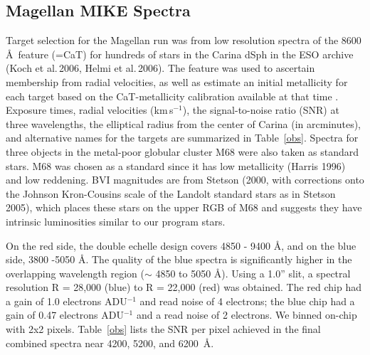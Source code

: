\documentclass{emulateapj}
\newcommand\kms{km\,s$^{-1}$}
\newcommand\etal{{\rm et al.\,}}
\begin{document}
\subsection{Magellan MIKE Spectra }

Target selection for the Magellan run was from low resolution 
spectra of the  8600 \AA\ feature (=CaT) for hundreds of stars 
in the Carina dSph in the ESO archive (Koch \etal 2006, Helmi \etal 2006).    
The feature was used to ascertain membership from radial velocities, 
as well as estimate an initial metallicity for each target based 
on the CaT-metallicity calibration available at that time 
\citep{Bat08}.
%
Exposure times, 
radial velocities (\kms), 
the signal-to-noise ratio (SNR) at three wavelengths, 
the elliptical radius from the center of Carina (in arcminutes),
and alternative names for the targets are summarized in Table~\ref{obs}. 
Spectra for
three objects in the metal-poor globular cluster M68 were also taken
as standard stars.   M68 was chosen as a standard since it has
low metallicity (Harris 1996) and low reddening.   BVI magnitudes
are from Stetson (2000, with corrections onto the Johnson Kron-Cousins
scale of the Landolt standard stars as in Stetson 2005), which places
these stars on the upper RGB of M68 and suggests they have 
intrinsic luminosities similar to our program stars.

On the red side, the double echelle design covers 4850 - 9400 \AA, 
and on the blue side, 3800 -5050 \AA. The quality of the blue spectra
is significantly higher in the 
overlapping wavelength region ($\sim$ 4850 to 5050 \AA).
%
Using a 1.0'' slit, a spectral resolution R = 28,000
(blue) to R = 22,000 (red) was obtained.
%
The red chip had a gain of 1.0 electrons ADU$^{-1}$ and 
read noise of 4 electrons; the blue chip had a gain of 
0.47 electrons ADU$^{-1}$ and a read noise of 2 electrons.  
We binned on-chip with 2x2 pixels.   Table~\ref{obs} lists
the SNR per pixel achieved in the final combined spectra near 
4200, 5200, and 6200~\AA.
\end{document}
